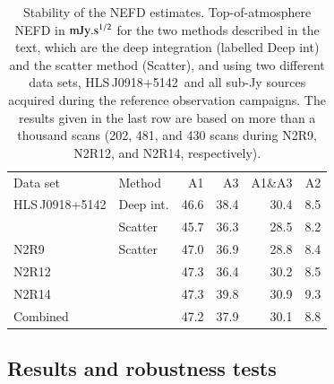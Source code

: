 \documentclass[traditionalabstract]{aa}
\newcommand{\hls}{HLS\,J0918+5142}
\begin{document}
{%
\begin{table}[!htbp]
  \centering
  \caption[]{Stability of the NEFD estimates. Top-of-atmosphere NEFD
    in $\rm{mJy}.s^{1/2}$ for the two methods described in the text, which
  are the deep integration (labelled Deep int) and the scatter method
  (Scatter), and using two different data sets, \hls\
  and all sub-Jy sources acquired during the reference observation
  campaigns. The results given in the last row are based on more than a thousand
  scans (202, 481, and 430 scans during N2R9, N2R12, and N2R14, respectively).}
  \label{tab:nefd_summary}
  \begin{tabular}{llrrrr}
    \hline\hline
    \noalign{\smallskip}
    Data set   & Method   & A1      &   A3    &   A1\&A3 &    A2 \\
    \noalign{\smallskip}
    \hline
    \noalign{\smallskip}
    \hls &     Deep int.  &  46.6  &    38.4  &    30.4  &   8.5  \\
         &     Scatter    &  45.7  &    36.3  &    28.5  &   8.2  \\
    \hline
    \noalign{\smallskip}
    N2R9     & Scatter    & 47.0 &  36.9  & 28.8  & 8.4 \\
    N2R12    &            & 47.3 &  36.4  & 30.2  & 8.5 \\
    N2R14    &            & 47.3 &  39.8  & 30.9  & 9.3 \\
    Combined &            & 47.2 &  37.9  & 30.1  & 8.8 \\
    \hline
  \end{tabular}
\end{table}

\subsection{Results and robustness tests}
\label{se:nefd_results}

}
\end{document}
